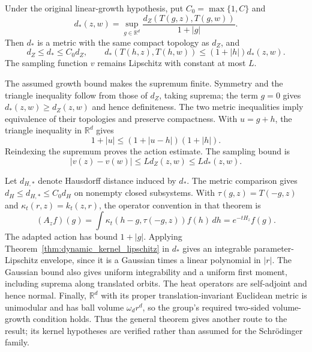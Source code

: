 \begin{lemma}
\label{lem:dynamic_adapted_metric}
Under the original linear-growth hypothesis, put $C_0=\max\{1,C\}$ and
\[
d_*(z,w)=\sup_{g\in\mathbb R^d}
 \frac{d_Z(T(g,z),T(g,w))}{1+|g|}.
\]
Then $d_*$ is a metric with the same compact topology as $d_Z$, and
\[
d_Z\leq d_*\leq C_0d_Z,\qquad
 d_*(T(h,z),T(h,w))\leq(1+|h|)d_*(z,w).
\]
The sampling function $v$ remains Lipschitz with constant at most $L$.
\end{lemma}
\Proof
The assumed growth bound makes the supremum finite. Symmetry and the
triangle inequality follow from those of $d_Z$, taking suprema; the
term $g=0$ gives $d_*(z,w)\geq d_Z(z,w)$ and hence definiteness.
The two metric inequalities imply equivalence of their topologies and
preserve compactness. With $u=g+h$, the triangle inequality in
$\mathbb R^d$ gives
\[
1+|u|\leq(1+|u-h|)(1+|h|).
\]
Reindexing the supremum proves the action estimate. The sampling bound is
\[
|v(z)-v(w)|\leq Ld_Z(z,w)\leq Ld_*(z,w).
\]
\Done

Let $d_{H,*}$ denote Hausdorff distance induced by $d_*$.
The metric comparison gives $d_H\leq d_{H,*}\leq C_0d_H$ on
nonempty closed subsystems. With $\tau(g,z)=T(-g,z)$ and
$\kappa_t(r,z)=k_t(z,r)$, the operator convention in that theorem is
\[
(A_zf)(g)=\int\kappa_t(h-g,\tau(-g,z))f(h)\,dh
        =e^{-tH_z}f(g).
\]
The adapted action has bound $1+|g|$. Applying
Theorem~\ref{thm:dynamic_kernel_lipschitz} in $d_*$ gives an integrable
parameter-Lipschitz envelope, since it is a Gaussian times a linear
polynomial in $|r|$. The Gaussian bound also gives uniform integrability
and a uniform first moment, including suprema along translated orbits.
The heat operators are self-adjoint and hence normal. Finally,
$\mathbb R^d$ with its proper translation-invariant Euclidean metric
is unimodular and has ball volume $\omega_d r^d$, so the group's required
two-sided volume-growth condition holds. Thus the general theorem gives
another route to the result; its kernel hypotheses are verified rather
than assumed for the Schr\"odinger family.

